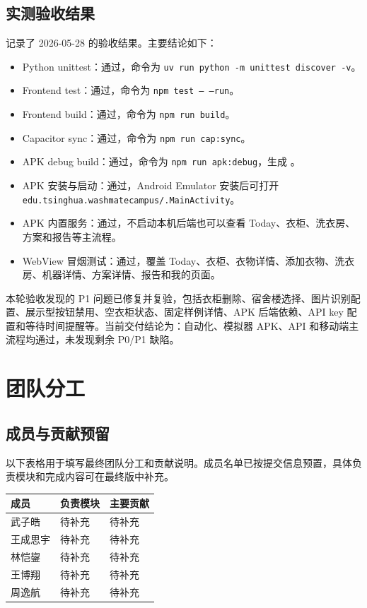 \documentclass[11pt,a4paper]{ctexart}
\begin{document}
\subsection{实测验收结果}

 记录了 2026-05-28 的验收结果。主要结论如下：

\begin{itemize}
  \item Python unittest：通过，命令为 \texttt{uv run python -m unittest discover -v}。
  \item Frontend test：通过，命令为 \texttt{npm test -- --run}。
  \item Frontend build：通过，命令为 \texttt{npm run build}。
  \item Capacitor sync：通过，命令为 \texttt{npm run cap:sync}。
  \item APK debug build：通过，命令为 \texttt{npm run apk:debug}，生成 。
  \item APK 安装与启动：通过，Android Emulator 安装后可打开 \texttt{edu.tsinghua.washmatecampus/.MainActivity}。
  \item APK 内置服务：通过，不启动本机后端也可以查看 Today、衣柜、洗衣房、方案和报告等主流程。
  \item WebView 冒烟测试：通过，覆盖 Today、衣柜、衣物详情、添加衣物、洗衣房、机器详情、方案详情、报告和我的页面。
\end{itemize}

本轮验收发现的 P1 问题已修复并复验，包括衣柜删除、宿舍楼选择、图片识别配置、展示型按钮禁用、空衣柜状态、固定样例详情、APK 后端依赖、API key 配置和等待时间提醒等。当前交付结论为：自动化、模拟器 APK、API 和移动端主流程均通过，未发现剩余 P0/P1 缺陷。

\section{团队分工}

\subsection{成员与贡献预留}

以下表格用于填写最终团队分工和贡献说明。成员名单已按提交信息预置，具体负责模块和完成内容可在最终版中补充。

\begin{longtable}{p{} p{} p{}}
\toprule
成员 & 负责模块 & 主要贡献 \\
\midrule
武子皓 & 待补充 & 待补充 \\
王成思宇 & 待补充 & 待补充 \\
林恺鋆 & 待补充 & 待补充 \\
王博翔 & 待补充 & 待补充 \\
周逸航 & 待补充 & 待补充 \\
\bottomrule
\end{longtable}
\end{document}
